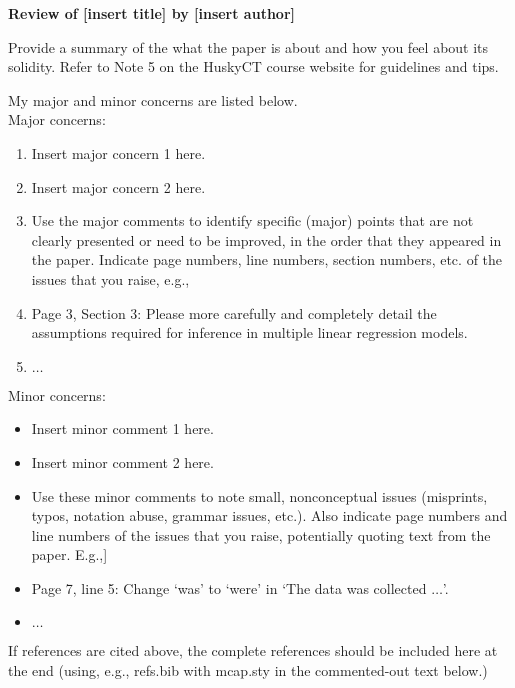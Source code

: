 \documentclass[11pt]{article}
\begin{document}
\begin{center} \Large \bf
  Review of [insert title] by [insert author]
\end{center}


Provide a summary of the what the paper is about and how you feel about its 
solidity. Refer to Note 5 on the HuskyCT course website for guidelines and tips.


My major and minor concerns are listed below.\\

\noindent Major concerns:
\begin{enumerate}
\item Insert major concern 1 here.
\item Insert major concern 2 here.
\item Use the major comments to identify specific (major) points that are not 
clearly presented or need to be improved, in the order that they appeared in 
the paper. Indicate page numbers, line numbers, section numbers, etc.  
of the issues that you raise, e.g.,
\item Page 3, Section 3: Please more carefully and completely detail the 
assumptions required for inference in multiple linear regression models. 
\item $\ldots$
\end{enumerate}

\noindent Minor concerns:
\begin{itemize}
\item Insert minor comment 1 here.
\item Insert minor comment 2 here. 
\item Use these minor comments to note small, nonconceptual issues (misprints, 
typos, notation abuse, grammar issues, etc.).  Also indicate page numbers 
and line numbers of the issues that you raise, potentially quoting text 
from the paper.  E.g.,] 
\item Page 7, line 5: Change `was' to `were' in `The data was collected 
$\ldots$'.
\item $\ldots$
\end{itemize}

If references are cited above, the complete references should be included here 
at the end (using, e.g., refs.bib with mcap.sty in the commented-out text 
below.)
%
% 
\end{document}

